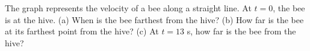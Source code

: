 The graph represents the velocity of a bee along a
straight line.  At $t=0$, the bee is at the hive.  (a) When
is the bee farthest from the hive? (b) How far is the bee at
its farthest point from the hive? (c) At $t=13$ s, how far is
the bee from the hive? \answercheck
